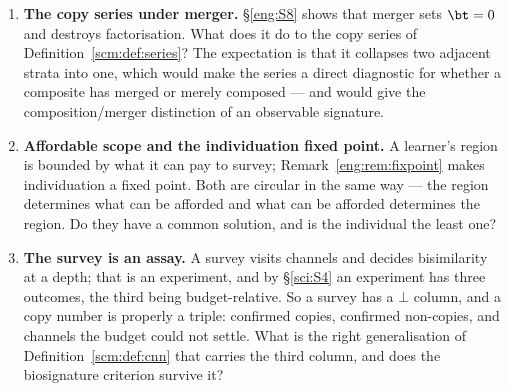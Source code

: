 \begin{enumerate}[label=\textbf{Gap \arabic*.}, leftmargin=*, itemsep=8pt]
  \item \textbf{The copy series under merger.}
        \S\ref{eng:S8} shows that merger sets $\bt = 0$ and destroys
        factorisation.
        What does it do to the copy series of
        Definition~\ref{scm:def:series}?
        The expectation is that it collapses two adjacent strata into
        one, which would make the series a direct diagnostic for
        whether a composite has merged or merely composed --- and
        would give the composition/merger distinction of \chComp an
        observable signature.

  \item \textbf{Affordable scope and the individuation fixed point.}
        A learner's region is bounded by what it can pay to survey;
        Remark~\ref{eng:rem:fixpoint} makes individuation a fixed
        point.
        Both are circular in the same way --- the region determines
        what can be afforded and what can be afforded determines the
        region.
        Do they have a common solution, and is the individual the
        least one?

  \item \textbf{The survey is an assay.}
        A survey visits channels and decides bisimilarity at a depth;
        that is an experiment, and by \S\ref{sci:S4} an experiment has
        three outcomes, the third being budget-relative.
        So a survey has a $\bot$ column, and a copy number is properly
        a triple: confirmed copies, confirmed non-copies, and channels
        the budget could not settle.
        What is the right generalisation of
        Definition~\ref{scm:def:cnn} that carries the third column,
        and does the biosignature criterion survive it?

\end{enumerate}

